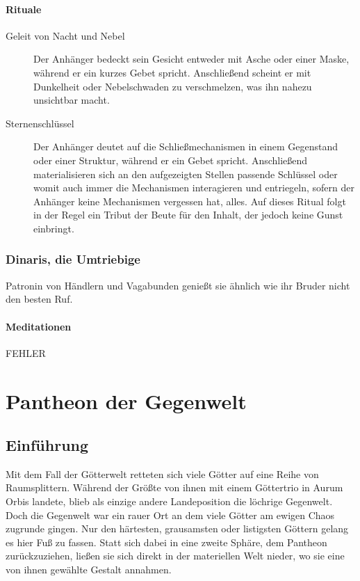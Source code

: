 \documentclass[a4paper,12pt,oneside]{book}
\begin{document}
\subsubsection{Rituale}
\begin{description}
\item[Geleit von Nacht und Nebel]
Der Anhänger bedeckt sein Gesicht entweder mit Asche oder einer Maske, während er ein kurzes Gebet spricht. Anschließend scheint er mit Dunkelheit oder Nebelschwaden zu verschmelzen, was ihn nahezu unsichtbar macht.
\item[Sternenschlüssel]
Der Anhänger deutet auf die Schließmechanismen in einem Gegenstand oder einer Struktur, während er ein Gebet spricht. Anschließend materialisieren sich an den aufgezeigten Stellen passende Schlüssel oder womit auch immer die Mechanismen interagieren und entriegeln, sofern der Anhänger keine Mechanismen vergessen hat, alles. Auf dieses Ritual folgt in der Regel ein Tribut der Beute für den Inhalt, der jedoch keine Gunst einbringt.
\end{description}

\subsection{Dinaris, die Umtriebige}
Patronin von Händlern und Vagabunden genießt sie ähnlich wie ihr Bruder nicht den besten Ruf.
\subsubsection{Meditationen} 
\begin{description}
\item[FEHLER]
\end{description}

\chapter{Pantheon der Gegenwelt}

\section{Einführung}
Mit dem Fall der Götterwelt retteten sich viele Götter auf eine Reihe von Raumsplittern. Während der Größte von ihnen mit einem Göttertrio in Aurum Orbis landete, blieb als einzige andere Landeposition die löchrige Gegenwelt. Doch die Gegenwelt war ein rauer Ort an dem viele Götter am ewigen Chaos zugrunde gingen. Nur den härtesten, grausamsten oder listigsten Göttern gelang es hier Fuß zu fassen. Statt sich dabei in eine zweite Sphäre, dem Pantheon zurückzuziehen, ließen sie sich direkt in der materiellen Welt nieder, wo sie eine von ihnen gewählte Gestalt annahmen.
\end{document}

